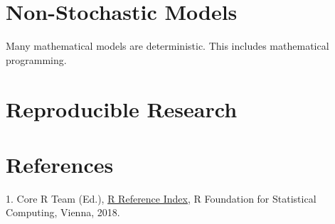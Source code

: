 \documentclass[]{book}
\theoremstyle{definition}
\theoremstyle{definition}
\theoremstyle{definition}
\theoremstyle{remark}
\begin{document}
\chapter{Non-Stochastic Models}\label{non-stochastic-models}

 Many mathematical models are deterministic. This
includes mathematical programming.

\chapter{Reproducible Research}\label{reproducible-research}

 

\chapter{References}\label{references}

 1. Core R Team (Ed.),
\href{https://cran.cnr.berkeley.edu/doc/manuals/r-release/fullrefman.pdf}{R
Reference Index}, R Foundation for Statistical Computing, Vienna, 2018.
\end{document}

